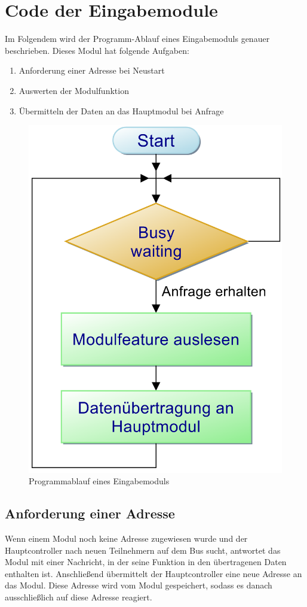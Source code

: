 


\section{Code der Eingabemodule}
\label{Code der Eingabemodule}
Im Folgendem wird der Programm-Ablauf eines Eingabemoduls genauer beschrieben. Dieses Modul hat folgende Aufgaben:
\begin{enumerate}
    \item Anforderung einer Adresse bei Neustart
    \item Auswerten der Modulfunktion
    \item Übermitteln der Daten an das Hauptmodul bei Anfrage
\end{enumerate}

\begin{figure}[H]
	\centering    
	\includegraphics[width=.75\textwidth]{Bilder/pap_eingabemodul.png}
	\caption{Programmablauf eines Eingabemoduls}
	\label{Programm_Eingabemodul}
\end{figure}


\subsection{Anforderung einer Adresse}
Wenn einem Modul noch keine Adresse zugewiesen wurde und der Hauptcontroller nach neuen Teilnehmern auf dem Bus sucht, antwortet das Modul mit einer Nachricht, in der seine Funktion in den übertragenen Daten enthalten ist. Anschließend übermittelt der Hauptcontroller eine neue Adresse an das Modul. Diese Adresse wird vom Modul gespeichert, sodass es danach ausschließlich auf diese Adresse reagiert.\\

